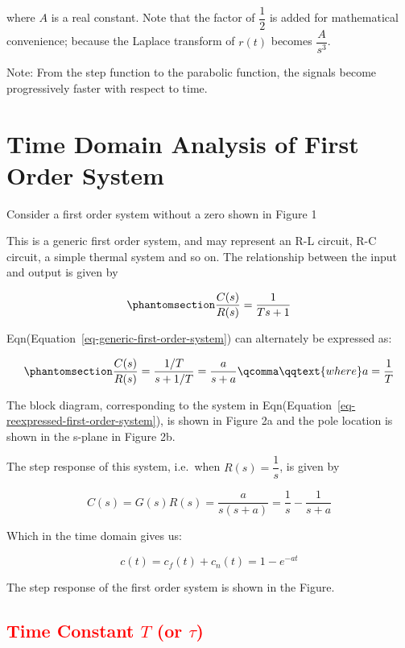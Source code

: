 \documentclass[
  14pt,
  a4paper,
  oneside,
  open=any,
  a4paper,
  14pt]{report}
\begin{document}
where \(A\) is a real constant. Note that the factor of \(\dfrac{1}{2}\)
is added for mathematical convenience; because the Laplace transform of
\(r(t)\) becomes \(\dfrac{A}{s^3}\).

Note: From the step function to the parabolic function, the signals
become progressively faster with respect to time.

\section{Time Domain Analysis of First Order
System}\label{time-domain-analysis-of-first-order-system}

Consider a first order system without a zero shown in Figure 1

This is a generic first order system, and may represent an R-L circuit,
R-C circuit, a simple thermal system and so on. The relationship between
the input and output is given by

\begin{equation}\phantomsection\label{eq-generic-first-order-system}{
    \dfrac{C(s)}{R(s)} = \dfrac{1}{Ts+1}
}\end{equation}

Eqn(Equation~\ref{eq-generic-first-order-system}) can alternately be
expressed as:

\begin{equation}\phantomsection\label{eq-reexpressed-first-order-system}{
    \dfrac{C(s)}{R(s)} = \dfrac{1/T}{s+1/T} = \dfrac{a}{s+a} \qcomma \qqtext{where} a = \dfrac{1}{T}
}\end{equation}

The block diagram, corresponding to the system in
Eqn(Equation~\ref{eq-reexpressed-first-order-system}), is shown in
Figure 2a and the pole location is shown in the s-plane in Figure 2b.

The step response of this system, i.e.~when \(R(s) = \dfrac{1}{s}\), is
given by

\[
    C(s) = G(s)R(s) = \dfrac{a}{s(s+a)} = \dfrac{1}{s} - \dfrac{1}{s+a}
\]

Which in the time domain gives us:

\[
    c(t) = c_f(t) + c_n(t) = 1 - e^{-at}
\]

The step response of the first order system is shown in the Figure.

\subsection{\texorpdfstring{\textcolor{red}{Time Constant \(T\) (or
\(\tau\))}}{Time Constant T (or \textbackslash tau)}}\label{time-constant-t-or-tau}
\end{document}
